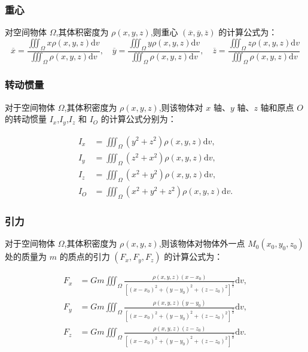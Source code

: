 \documentclass[UTF8]{ctexart}
\theoremstyle{remark}
\begin{document}
			\subsubsection{重心}
			对空间物体 \( \Omega \),其体积密度为 \( \rho(x, y, z) \),则重心 \( (\overline{x}, \overline{y}, \overline{z}) \) 的计算公式为：
			\[ 
			\overline{x} = \frac{\iiint_{\Omega} x \rho(x, y, z) \mathrm{d}v}{\iiint_{\Omega} \rho(x, y, z) \mathrm{d}v}, \quad
			\overline{y} = \frac{\iiint_{\Omega} y \rho(x, y, z) \mathrm{d}v}{\iiint_{\Omega} \rho(x, y, z) \mathrm{d}v}, \quad
			\overline{z} = \frac{\iiint_{\Omega} z \rho(x, y, z) \mathrm{d}v}{\iiint_{\Omega} \rho(x, y, z) \mathrm{d}v}
			\]
			
			\subsubsection{转动惯量}
			对于空间物体 \( \Omega \),其体积密度为 \( \rho(x, y, z) \),则该物体对 \( x \) 轴、\( y \) 轴、\( z \) 轴和原点 \( O \) 的转动惯量 \( I_x \),\( I_y \),\( I_z \) 和 \( I_O \) 的计算公式分别为：
			 
			\begin{align*}
				I_x &= \iiint_{\Omega} (y^2 + z^2) \rho(x, y, z) \mathrm{d}v, \\
				I_y &= \iiint_{\Omega} (z^2 + x^2) \rho(x, y, z) \mathrm{d}v, \\
				I_z &= \iiint_{\Omega} (x^2 + y^2) \rho(x, y, z) \mathrm{d}v, \\
				I_O &= \iiint_{\Omega} (x^2 + y^2 + z^2) \rho(x, y, z) \mathrm{d}v.
			\end{align*}
			
			
			\subsubsection{引力}
			对于空间物体 \( \Omega \),其体积密度为 \( \rho(x, y, z) \),则该物体对物体外一点 \( M_0(x_0, y_0, z_0) \) 处的质量为 \( m \) 的质点的引力 \( (F_x, F_y, F_z) \) 的计算公式为：
			
			\begin{align*}
				F_x &= Gm \iiint_{\Omega} \frac{\rho(x, y, z)(x - x_0)}{[(x - x_0)^2 + (y - y_0)^2 + (z - z_0)^2]^{\frac{3}{2}}} \mathrm{d}v, \\
				F_y &= Gm \iiint_{\Omega} \frac{\rho(x, y, z)(y - y_0)}{[(x - x_0)^2 + (y - y_0)^2 + (z - z_0)^2]^{\frac{3}{2}}} \mathrm{d}v, \\
				F_z &= Gm \iiint_{\Omega} \frac{\rho(x, y, z)(z - z_0)}{[(x - x_0)^2 + (y - y_0)^2 + (z - z_0)^2]^{\frac{3}{2}}} \mathrm{d}v.
			\end{align*}
			
\end{document}
